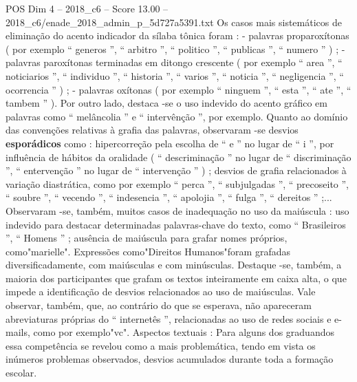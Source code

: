 \begin{textsample}{POS Dim 4 – 2018\_c6 – Score 13.00 – 2018\_c6/enade\_2018\_admin\_p\_5d727a5391.txt}
Os casos mais sistemáticos de eliminação do acento indicador da sílaba tônica foram : - palavras proparoxítonas ( por exemplo “ generos ”, “ arbitro ”, “ politico ”, “ publicas ”, “ numero ” ) ; - palavras paroxítonas terminadas em ditongo crescente ( por exemplo “ area ”, “ noticiarios ”, “ individuo ”, “ historia ”, “ varios ”, “ noticia ”, “ negligencia ”, “ ocorrencia ” ) ; - palavras oxítonas ( por exemplo “ ninguem ”, “ esta ”, “ ate ”, “ tambem ” ).
Por outro lado, destaca -se o uso indevido do acento gráfico em palavras como “ melâncolia ” e “ intervênção ”, por exemplo.
Quanto ao domínio das convenções relativas à grafia das palavras, observaram -se desvios \textbf{esporádicos} como : hipercorreção pela escolha de “ e ” no lugar de “ i ”, por influência de hábitos da oralidade ( “ descriminação ” no lugar de “ discriminação ”, “ entervenção ” no lugar de “ intervenção ” ) ; desvios de grafia relacionados à variação diastrática, como por exemplo “ perca ”, “ subjulgadas ”, “ precoseito ”, “ soubre ”, “ vecendo ”, “ indesencia ”, “ apolojia ”, “ fulga ”, “ dereitos ” ;...
Observaram -se, também, muitos casos de inadequação no uso da maiúscula : uso indevido para destacar determinadas palavras-chave do texto, como “ Brasileiros ”, “ Homens ” ; ausência de maiúscula para grafar nomes próprios, como"marielle".
Expressões como"Direitos Humanos"foram grafadas diversificadamente, com maiúsculas e com minúsculas.
Destaque -se, também, a maioria dos participantes que grafam os textos inteiramente em caixa alta, o que impede a identificação de desvios relacionados ao uso de maiúsculas.
Vale observar, também, que, ao contrário do que se esperava, não apareceram abreviaturas próprias do “ internetês ”, relacionadas ao uso de redes sociais e e-mails, como por exemplo"vc".
Aspectos textuais : Para alguns dos graduandos essa competência se revelou como a mais problemática, tendo em vista os inúmeros problemas observados, desvios acumulados durante toda a formação escolar.

\end{textsample}
